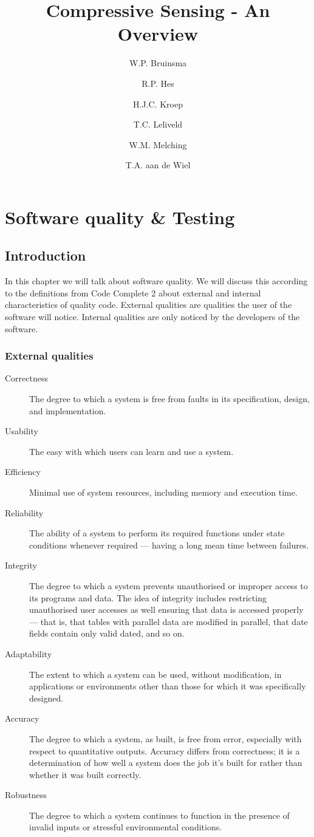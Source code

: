 \documentclass[a4paper, openany, oneside]{memoir}
\title{Compressive Sensing - An Overview}
\author{W.P. Bruinsma \and R.P. Hes \and H.J.C. Kroep \and T.C. Leliveld \and W.M. Melching \and T.A. aan de Wiel}
\begin{document}
\chapter{Software quality \& Testing}
\section{Introduction}
In this chapter we will talk about software quality. We will discuss this according to the definitions from Code Complete 2 about external and internal characteristics of quality code. External qualities are qualities the user of the software will notice. Internal qualities are only noticed by the developers of the software.\cite{mcconnell2004code}

\subsection{External qualities}
\begin{description}
\item[Correctness] The degree to which a system is free from faults in its specification, design, and implementation.
\item[Usability] The easy with which users can learn and use a system.
\item[Efficiency] Minimal use of system resources, including memory and execution time.
\item[Reliability] The ability of a system to perform its required functions under state conditions whenever required --- having a long mean time between failures.
\item[Integrity] The degree to which a system prevents unauthorised or improper access to its programs and data. The idea of integrity includes restricting unauthorised user accesses as well ensuring that data is accessed properly --- that is, that tables with parallel data are modified in parallel, that date fields contain only valid dated, and so on.
\item[Adaptability] The extent to which a system can be used, without modification, in applications or environments other than those for which it was specifically designed.
\item[Accuracy] The degree to which a system, as built, is free from error, especially with respect to quantitative outputs. Accuracy differs from correctness; it is a determination of how well a system does the job it's built for rather than whether it was built correctly.
\item[Robustness] The degree to which a system continues to function in the presence of invalid inputs or stressful environmental conditions.
\end{description}
\end{document}
